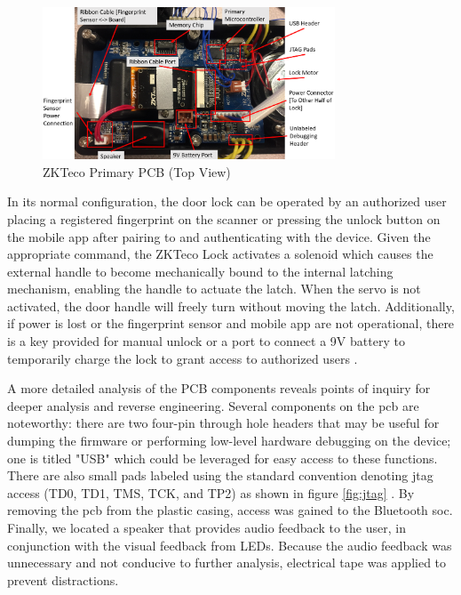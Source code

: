 \documentclass[conference]{IEEEtran}
\begin{document}
\begin{figure}[ht]
  \includegraphics[width=8.7cm]{images/MainPCB(Labeled).png}
  \caption{ZKTeco Primary PCB (Top View)}
  \label{fig:pcb1}
\end{figure}

\bigskip 

In its normal configuration, the door lock can be operated by an authorized user placing a registered fingerprint on the scanner or pressing the unlock button on the mobile app after pairing to and authenticating with the device. Given the appropriate command, the ZKTeco Lock activates a solenoid which causes the external handle to become mechanically bound to the internal latching mechanism, enabling the handle to actuate the latch. When the servo is not activated, the door handle will freely turn without moving the latch. Additionally, if power is lost or the fingerprint sensor and mobile app are not operational, there is a key provided for manual unlock or a port to connect a 9V battery to temporarily charge the lock to grant access to authorized users \cite{ZKTeco}.

\bigskip 

A more detailed analysis of the PCB components reveals points of inquiry for deeper analysis and reverse engineering. Several components on the \gls{pcb} are noteworthy: there are two four-pin through hole headers that may be useful for dumping the firmware or performing low-level hardware debugging on the device; one is titled "USB" which could be leveraged for easy access to these functions. There are also small pads labeled using the standard convention denoting \gls{jtag} access (TD0, TD1, TMS, TCK, and TP2) as shown in figure \ref{fig:jtag} \cite{IEEE2013}. By removing the \gls{pcb} from the plastic casing, access was gained to the Bluetooth \gls{soc}. Finally, we located a speaker that provides audio feedback to the user, in conjunction with the visual feedback from LEDs.  Because the audio feedback was unnecessary and not conducive to further analysis, electrical tape was applied to prevent distractions.
\end{document}
